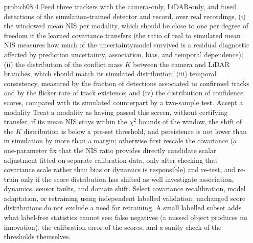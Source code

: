 \documentclass[graybox,envcountchap]{style/SNmono}
\providecommand{\DIFadd}[1]{{\protect\color{blue} #1}} %
\providecommand{\DIFdel}[1]{{\protect\color{red} #1}} %
\providecommand{\DIFaddbegin}{} %
\providecommand{\DIFaddend}{} %
\providecommand{\DIFdelbegin}{} %
\providecommand{\DIFdelend}{} %
\begin{document}
\begin{sol}{prob:ch08:4}
Feed three trackers with the camera-only, LiDAR-only, and fused detections of the simulation-trained detector and record, over real recordings, (i) the windowed mean NIS per modality, which should be close to one per degree of freedom if the learned covariance transfers (the ratio \DIFdelbegin \DIFdel{of real to simulated mean NIS measures how much of the uncertaintymodel survived}\DIFdelend \DIFaddbegin \DIFadd{is a residual diagnostic affected by prediction uncertainty, association, bias, and temporal dependence}\DIFaddend ); (ii) the distribution of the conflict mass $K$ between the camera and LiDAR branches, which should match its simulated distribution; (iii) temporal consistency, measured by the fraction of detections associated to confirmed tracks and by the flicker rate of track existence; and (iv) the distribution of confidence scores, compared with its simulated counterpart by a two-sample test. \DIFdelbegin \DIFdel{Accept a modality }\DIFdelend \DIFaddbegin \DIFadd{Treat a modality as having passed this screen, without certifying transfer, }\DIFaddend if its mean NIS stays within the $\chi^2$ bounds of the window, the shift of the $K$ distribution is below a pre-set threshold, and persistence is not lower than in simulation by more than a margin; otherwise first rescale the covariance (a \DIFdelbegin \DIFdel{one-parameter fix that the NIS ratio provides directly}\DIFdelend \DIFaddbegin \DIFadd{candidate scalar adjustment fitted on separate calibration data, only after checking that covariance scale rather than bias or dynamics is responsible}\DIFaddend ) and re-test, and \DIFdelbegin \DIFdel{re-train only if the score distribution has shifted as well}\DIFdelend \DIFaddbegin \DIFadd{investigate association, dynamics, sensor faults, and domain shift. Select covariance recalibration, model adaptation, or retraining using independent labelled validation; unchanged score distributions do not exclude a need for retraining}\DIFaddend . A small labelled subset adds what label-free statistics cannot see: false negatives (a missed object produces no innovation), the calibration error of the scores, and a sanity check of the thresholds themselves.
\end{sol}
\end{document}
